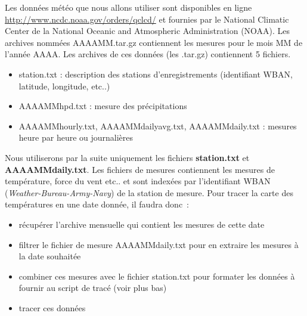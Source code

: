 Les données météo que nous allons utiliser sont disponibles en ligne
\url{http://www.ncdc.noaa.gov/orders/qclcd/} et fournies par le
National Climatic Center de la National Oceanic and Atmospheric
Administration (NOAA). Les archives nommées AAAAMM.tar.gz
contiennent les mesures pour le mois MM de l'année AAAA. Les archives de ces données (les .tar.gz)
contiennent 5 fichiers. 
\begin{itemize}
\item station.txt : description des stations d'enregistrements
  (identifiant WBAN, latitude, longitude, etc..)
\item AAAAMMhpd.txt : mesure des précipitations
\item AAAAMMhourly.txt, AAAAMMdailyavg.txt, AAAAMMdaily.txt : mesures
  heure par heure ou journalières\\
\end{itemize}

Nous utiliserons par la suite uniquement les fichiers \textbf{station.txt} et
\textbf{AAAAMMdaily.txt}. Les fichiers de mesures contiennent les mesures de
température, force du vent etc.. et sont indexées par l'identifiant
WBAN (\emph{Weather-Bureau-Army-Navy}) de la station de mesure. Pour tracer la carte des températures en
une date donnée, il faudra donc~:
\begin{itemize}
\item récupérer l'archive mensuelle qui contient les mesures de cette date
\item filtrer le fichier de mesure AAAAMMdaily.txt pour en extraire
  les mesures à la date souhaitée
\item combiner ces mesures avec le fichier station.txt pour formater
  les données à fournir au script de tracé (voir plus bas)
\item tracer ces données
\end{itemize}

